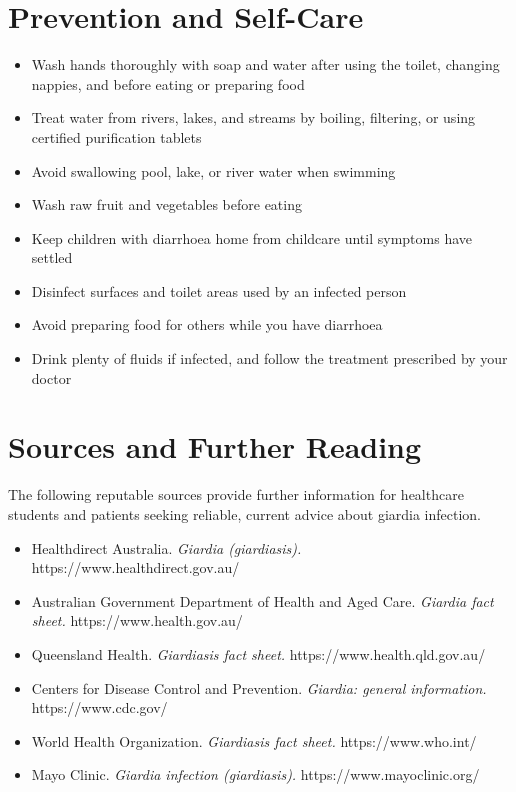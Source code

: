 \section*{Prevention and Self-Care}
\begin{itemize}
    \item Wash hands thoroughly with soap and water after using the toilet, changing nappies, and before eating or preparing food
    \item Treat water from rivers, lakes, and streams by boiling, filtering, or using certified purification tablets
    \item Avoid swallowing pool, lake, or river water when swimming
    \item Wash raw fruit and vegetables before eating
    \item Keep children with diarrhoea home from childcare until symptoms have settled
    \item Disinfect surfaces and toilet areas used by an infected person
    \item Avoid preparing food for others while you have diarrhoea
    \item Drink plenty of fluids if infected, and follow the treatment prescribed by your doctor
\end{itemize}

\section*{Sources and Further Reading}
The following reputable sources provide further information for healthcare students and patients seeking reliable, current advice about giardia infection.

\begin{itemize}
    \item Healthdirect Australia. \textit{Giardia (giardiasis).} https://www.healthdirect.gov.au/
    \item Australian Government Department of Health and Aged Care. \textit{Giardia fact sheet.} https://www.health.gov.au/
    \item Queensland Health. \textit{Giardiasis fact sheet.} https://www.health.qld.gov.au/
    \item Centers for Disease Control and Prevention. \textit{Giardia: general information.} https://www.cdc.gov/
    \item World Health Organization. \textit{Giardiasis fact sheet.} https://www.who.int/
    \item Mayo Clinic. \textit{Giardia infection (giardiasis).} https://www.mayoclinic.org/
\end{itemize}
